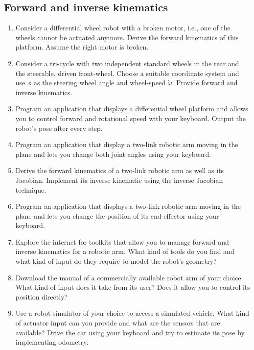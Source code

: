 \subsection*{Forward and inverse kinematics}
\begin{enumerate}
\item Consider a differential wheel robot with a broken motor, i.e., one of the wheels cannot be actuated anymore. Derive the forward kinematics of this platform. Assume the right motor is broken.
\item Consider a tri-cycle with two independent standard wheels in the rear and the steerable, driven front-wheel. Choose a suitable coordinate system and use $\phi$ as the steering wheel angle and wheel-speed $\dot{\omega}$. Provide forward and inverse kinematics.
\item Program an application that displays a differential wheel platform and allows you to control forward and rotational speed with your keyboard. Output the robot's pose after every step. 
\item Program an application that display a two-link robotic arm moving in the plane and lets you change both joint angles using your keyboard.
\item Derive the forward kinematics of a two-link robotic arm as well as its Jacobian. Implement its inverse kinematic using the inverse Jacobian technique. 
\item Program an application that displays a two-link robotic arm moving in the plane and lets you change the position of its end-effector using your keyboard.
\item Explore the internet for toolkits that allow you to manage forward and inverse kinematics for a robotic arm. What kind of tools do you find and what kind of input do they require to model the robot's geometry?
\item Download the manual of a commercially available robot arm of your choice. What kind of input does it take from its user? Does it allow you to control its position directly?
\item Use a robot simulator of your choice to access a simulated vehicle. What kind of actuator input can you provide and what are the sensors that are available? Drive the car using your keyboard and try to estimate its pose by implementing odometry. 
\end{enumerate}
\normalsize
